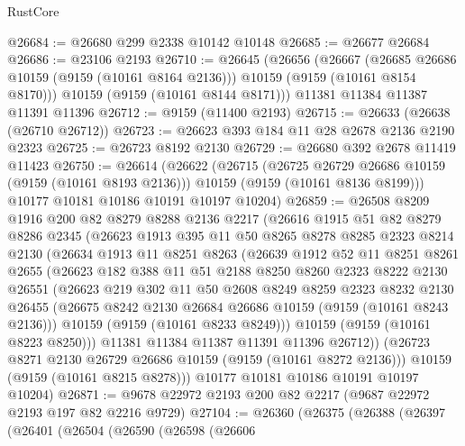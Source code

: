\begin{lexlean}{RustCore}
\begin{coremodule}
@26684 := @26680 @299 @2338 @10142 @10148
@26685 := @26677 @26684
@26686 := @23106 @2193
@26710 := @26645
    (@26656
      (@26667
        (@26685 @26686 @10159 (@9159 (@10161 @8164 @2136)))
        @10159
        (@9159 (@10161 @8154 @8170)))
      @10159
      (@9159 (@10161 @8144 @8171)))
    @11381
    @11384
    @11387
    @11391
    @11396
@26712 := @9159 (@11400 @2193)
@26715 := @26633 (@26638 (@26710 @26712))
@26723 := @26623 @393 @184 @11 @28 @2678 @2136 @2190 @2323
@26725 := @26723 @8192 @2130
@26729 := @26680 @392 @2678 @11419 @11423
@26750 := @26614
    (@26622
      (@26715
        (@26725 @26729 @26686 @10159 (@9159 (@10161 @8193 @2136)))
        @10159
        (@9159 (@10161 @8136 @8199)))
      @10177
      @10181
      @10186
      @10191
      @10197
      @10204)
@26859 := @26508
    @8209
    @1916
    @200
    @82
    @8279
    @8288
    @2136
    @2217
    (@26616
      @1915
      @51
      @82
      @8279
      @8286
      @2345
      (@26623
        @1913
        @395
        @11
        @50
        @8265
        @8278
        @8285
        @2323
        @8214
        @2130
        (@26634
          @1913
          @11
          @8251
          @8263
          (@26639
            @1912
            @52
            @11
            @8251
            @8261
            @2655
            (@26623
              @182
              @388
              @11
              @51
              @2188
              @8250
              @8260
              @2323
              @8222
              @2130
              @26551
              (@26623
                @219
                @302
                @11
                @50
                @2608
                @8249
                @8259
                @2323
                @8232
                @2130
                @26455
                (@26675 @8242 @2130 @26684 @26686 @10159 (@9159 (@10161 @8243 @2136)))
                @10159
                (@9159 (@10161 @8233 @8249)))
              @10159
              (@9159 (@10161 @8223 @8250)))
            @11381
            @11384
            @11387
            @11391
            @11396
            @26712))
        (@26723 @8271 @2130 @26729 @26686 @10159 (@9159 (@10161 @8272 @2136)))
        @10159
        (@9159 (@10161 @8215 @8278)))
      @10177
      @10181
      @10186
      @10191
      @10197
      @10204)
@26871 := @9678 @22972 @2193 @200 @82 @2217 (@9687 @22972 @2193 @197 @82 @2216 @9729)
@27104 := @26360
    (@26375
      (@26388
        (@26397
          (@26401
            (@26504
              (@26590
                (@26598
                  (@26606

\end{coremodule}
\end{lexlean}

